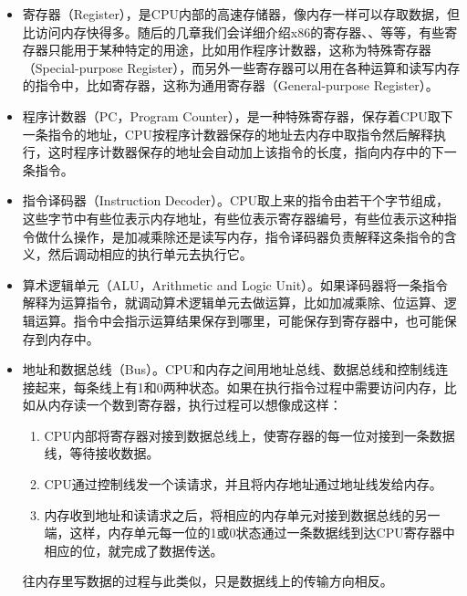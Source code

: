 \begin{itemize}

\item 寄存器（Register），是CPU内部的高速存储器，像内存一样可以存取数据，但比访问内存快得多。随后的几章我们会详细介绍x86的寄存器、、等等，有些寄存器只能用于某种特定的用途，比如用作程序计数器，这称为特殊寄存器（Special-purpose Register），而另外一些寄存器可以用在各种运算和读写内存的指令中，比如寄存器，这称为通用寄存器（General-purpose Register）。

\item 程序计数器（PC，Program Counter），是一种特殊寄存器，保存着CPU取下一条指令的地址，CPU按程序计数器保存的地址去内存中取指令然后解释执行，这时程序计数器保存的地址会自动加上该指令的长度，指向内存中的下一条指令。

\item 指令译码器（Instruction Decoder）。CPU取上来的指令由若干个字节组成，这些字节中有些位表示内存地址，有些位表示寄存器编号，有些位表示这种指令做什么操作，是加减乘除还是读写内存，指令译码器负责解释这条指令的含义，然后调动相应的执行单元去执行它。

\item 算术逻辑单元（ALU，Arithmetic and Logic Unit）。如果译码器将一条指令解释为运算指令，就调动算术逻辑单元去做运算，比如加减乘除、位运算、逻辑运算。指令中会指示运算结果保存到哪里，可能保存到寄存器中，也可能保存到内存中。

\item 地址和数据总线（Bus）。CPU和内存之间用地址总线、数据总线和控制线连接起来，每条线上有1和0两种状态。如果在执行指令过程中需要访问内存，比如从内存读一个数到寄存器，执行过程可以想像成这样：



\begin{enumerate}

\item CPU内部将寄存器对接到数据总线上，使寄存器的每一位对接到一条数据线，等待接收数据。

\item CPU通过控制线发一个读请求，并且将内存地址通过地址线发给内存。

\item 内存收到地址和读请求之后，将相应的内存单元对接到数据总线的另一端，这样，内存单元每一位的1或0状态通过一条数据线到达CPU寄存器中相应的位，就完成了数据传送。
\end{enumerate}


往内存里写数据的过程与此类似，只是数据线上的传输方向相反。
\end{itemize}


